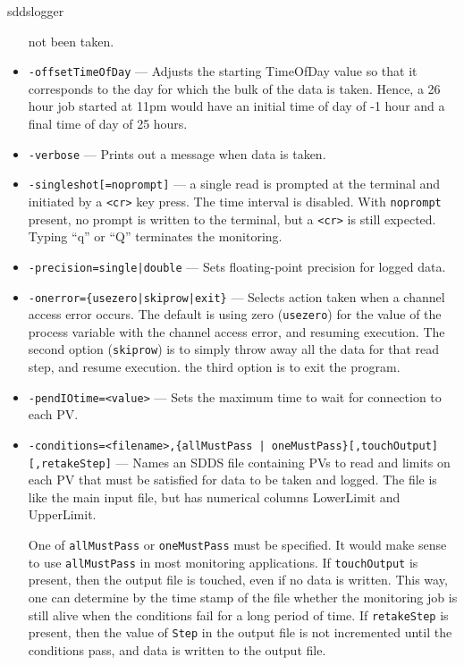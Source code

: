 \begin{sddsprog}{sddslogger}
\begin{itemize}
                not been taken.
        \item {\tt -offsetTimeOfDay} --- Adjusts the starting TimeOfDay value so that it corresponds to the
                day for which the bulk of the data is taken.  Hence, a 26 hour job started at 11pm would have an
                initial time of day of -1 hour and a final time of day of 25 hours.
        \item {\tt -verbose} --- Prints out a message when data is taken.
        \item {\verb+-singleshot[=noprompt]+} --- a single read is prompted at the terminal
                and initiated by a \verb+<cr>+ key press. The time interval is disabled.
                With \verb+noprompt+ present, no prompt is written to the terminal, but a \verb+<cr>+
                is still expected. Typing ``q'' or ``Q'' terminates the monitoring.
        \item {\tt -precision={single|double}} --- Sets floating-point precision for logged data.
        \item {\tt -onerror=\{usezero|skiprow|exit\}} --- Selects action taken when a channel access error occurs.
                The default is using zero ({\tt usezero}) for the value of the process variable 
                with the channel access error, and resuming execution. The second option ({\tt skiprow}) is to
                simply throw away all the data for that read step, and resume execution.
                the third option is to exit the program.
        \item {\tt -pendIOtime=<value>} --- Sets the maximum time to wait for connection to each PV.
        \item {\verb+-conditions=<filename>,{allMustPass | oneMustPass}[,touchOutput][,retakeStep]+} --- 
                   Names an SDDS file containing PVs to read and limits on each PV that must
                   be satisfied for data to be taken and logged.  The file is like the main
                   input file, but has numerical columns LowerLimit and UpperLimit.

                One of \verb+allMustPass+ or \verb+oneMustPass+ must be specified. It would make sense
                to use \verb+allMustPass+ in most monitoring applications.
                If \verb+touchOutput+ is present, then the output file is touched, even if no data
                is written. This way, one can determine by the time stamp of the file
                whether the monitoring job is still alive
                when the conditions fail for a long period of time. If \verb+retakeStep+ is
                present, then the value of \verb+Step+ in the output file is not
                incremented until the conditions pass, and data is written to the output file.
    \end{itemize}


\end{sddsprog}
